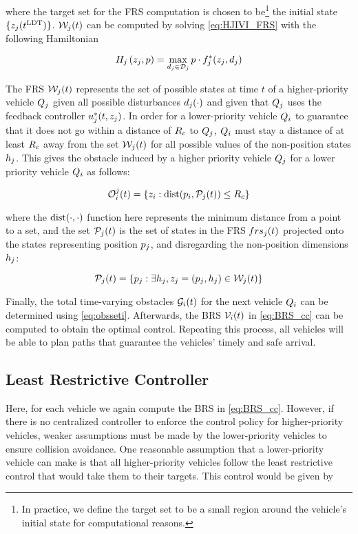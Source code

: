 \noindent where the target set for the FRS computation is chosen to be\footnote{In practice, we define the target set to be a small region around the vehicle's initial state for computational reasons.} the initial state $\{z_j(t^\text{LDT})\}$. $\mathcal{W}_j(t)$ can be computed by solving \eqref{eq:HJIVI_FRS} with the following Hamiltonian

\begin{equation}
H_j\left(z_j, p\right) = \max_{d_j \in \mathcal{D}_j} p \cdot f^*_j(z_j, d_j)
\end{equation}

The FRS $\mathcal{W}_j(t)$ represents the set of possible states at time $t$ of a higher-priority vehicle $Q_{j}$ given all possible disturbances $d_j(\cdot)$ and given that $Q_{j}$ uses the feedback controller $u_j^*(t, z_j)$. In order for a lower-priority vehicle $Q_{i}$ to guarantee that it does not go within a distance of $R_c$ to $Q_{j}$, $Q_{i}$ must stay a distance of at least $R_c$ away from the set $\mathcal{W}_j(t)$ for all possible values of the non-position states $h_j$. This gives the obstacle induced by a higher priority vehicle $Q_{j}$ for a lower priority vehicle $Q_{i}$ as follows:

\begin{equation}
\mathcal{O}_i^j(t) = \{z_i: \text{dist}(p_i, \mathcal{P}_j(t)) \le R_c \}
\end{equation}

\noindent where the $\text{dist}(\cdot, \cdot)$ function here represents the minimum distance from a point to a set, and the set $\mathcal{P}_j(t)$ is the set of states in the FRS $\\frs_j(t)$ projected onto the states representing position $p_j$, and disregarding the non-position dimensions $h_j$:

\begin{equation}
\mathcal{P}_j(t) = \{p_j: \exists h_j, z_j = (p_j, h_j) \in \mathcal{W}_j(t)\}
\end{equation}

Finally, the total time-varying obstacles $\mathcal{G}_i(t)$ for the next vehicle $Q_{i}$ can be determined using \eqref{eq:obsseti}. Afterwards, the BRS $\mathcal{V}_i(t)$ in \eqref{eq:BRS_cc} can be computed to obtain the optimal control. Repeating this process, all vehicles will be able to plan paths that guarantee the vehicles' timely and safe arrival.

\subsection{Least Restrictive Controller}
\label{sec:incomp_LRctrl}
Here, for each vehicle we again compute the BRS in \eqref{eq:BRS_cc}. However, if there is no centralized controller to enforce the control policy for higher-priority vehicles, weaker assumptions must be made by the lower-priority vehicles to ensure collision avoidance. One reasonable assumption that a lower-priority vehicle can make is that all higher-priority vehicles follow the least restrictive control that would take them to their targets. This control would be given by 

